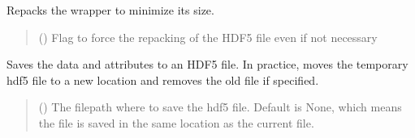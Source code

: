 \documentclass[letterpaper,10pt,english]{sphinxmanual}
\begin{document}
\begin{fulllineitems}
\begin{fulllineitems}
\begin{quote}
\begin{description}
\end{description}\end{quote}

\end{fulllineitems}


\begin{fulllineitems}
\label{\detokenize{_autosummary/HDF5_BLS.wrapper:HDF5_BLS.wrapper.Wrapper.repack}}
\pysigstartsignatures
\pysiglinewithargsret
{}
{}
{}
\pysigstopsignatures
\sphinxAtStartPar
Repacks the wrapper to minimize its size.
\begin{quote}\begin{description}
\sphinxAtStartPar
{} () \textendash{} Flag to force the repacking of the HDF5 file even if not necessary

\end{description}\end{quote}

\end{fulllineitems}


\begin{fulllineitems}
\label{\detokenize{_autosummary/HDF5_BLS.wrapper:HDF5_BLS.wrapper.Wrapper.save_as_hdf5}}
\pysigstartsignatures
\pysiglinewithargsret
{}
{\sphinxparamcomma {}\sphinxparamcomma {}}
{}
\pysigstopsignatures
\sphinxAtStartPar
Saves the data and attributes to an HDF5 file. In practice, moves the temporary hdf5 file to a new location and removes the old file if specified.
\begin{quote}\begin{description}
\sphinxAtStartPar
{} (\sphinxstyleliteralemphasis{\sphinxupquote{, }}) \textendash{} The filepath where to save the hdf5 file. Default is None, which means the file is saved in the same location as the current file.


\end{description}
\end{quote}
\end{fulllineitems}
\end{fulllineitems}
\end{document}
